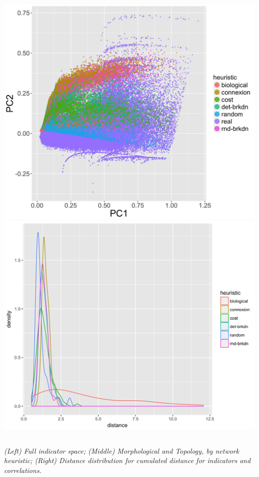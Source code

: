 {\begin{columns}
\includegraphics[width=\textwidth]{figures/coevol_pca_network_byheuristic}
\includegraphics[width=\textwidth]{figures/coevol_corrs-distrib_rhoasize4}

\end{columns}

\footnotesize\textit{(Left) Full indicator space; (Middle) Morphological and Topology, by network heuristic; (Right) Distance distribution for cumulated distance for indicators and correlations.}

}



